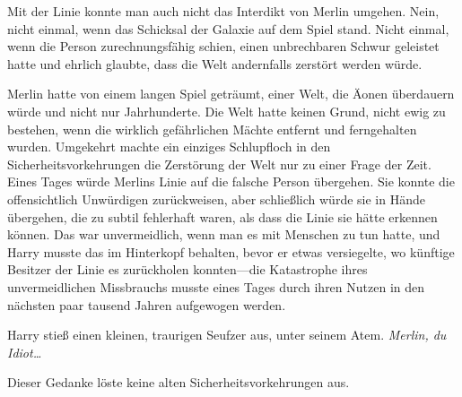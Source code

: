 Mit der Linie konnte man auch nicht das Interdikt von Merlin umgehen. Nein, nicht einmal, wenn das Schicksal der Galaxie auf dem Spiel stand. Nicht einmal, wenn die Person zurechnungsfähig schien, einen unbrechbaren Schwur geleistet hatte und ehrlich glaubte, dass die Welt andernfalls zerstört werden würde.

Merlin hatte von einem langen Spiel geträumt, einer Welt, die Äonen überdauern würde und nicht nur Jahrhunderte. Die Welt hatte keinen Grund, nicht ewig zu bestehen, wenn die wirklich gefährlichen Mächte entfernt und ferngehalten wurden. Umgekehrt machte ein einziges Schlupfloch in den Sicherheitsvorkehrungen die Zerstörung der Welt nur zu einer Frage der Zeit.
Eines Tages würde Merlins Linie auf die falsche Person übergehen. Sie konnte die offensichtlich Unwürdigen zurückweisen, aber schließlich würde sie in Hände übergehen, die zu subtil fehlerhaft waren, als dass die Linie sie hätte erkennen können. Das war unvermeidlich, wenn man es mit Menschen zu tun hatte, und Harry musste das im Hinterkopf behalten, bevor er etwas versiegelte, wo künftige Besitzer der Linie es zurückholen konnten—die Katastrophe ihres unvermeidlichen Missbrauchs musste eines Tages durch ihren Nutzen in den nächsten paar tausend Jahren aufgewogen werden.

Harry stieß einen kleinen, traurigen Seufzer aus, unter seinem Atem.
\emph{Merlin, du Idiot…}

Dieser Gedanke löste keine alten Sicherheitsvorkehrungen aus.

